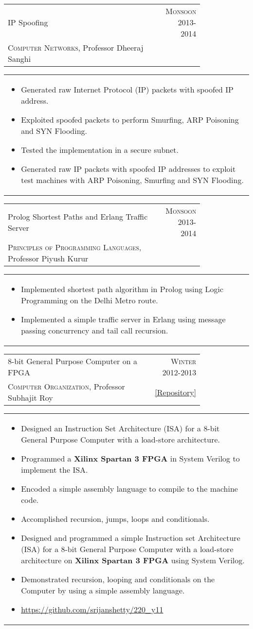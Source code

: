 \documentclass[a4paper,10pt]{article} %
\newcommand{\cproject}[5]{
    \begin{tabular}{p{0.80\linewidth}r}
        \textcolor{NavyBlue}{#2} & \multicolumn{1}{m{4cm}}{\raggedleft \textsc{#1}}\\
        #3 & #4
    \end{tabular}
    \begin{tabular}{p{\linewidth}}
    \vspace{-0.3cm}
        \footnotesize{#5}
    \end{tabular}
    \vspace{-0.5cm}
}
\newcommand{\lproject}[4]{
    \begin{tabular}{p{0.80\linewidth}r}
        \textcolor{NavyBlue}{#2} & \multicolumn{1}{m{4cm}}{\raggedleft \textsc{#1}}\\
        #3
    \end{tabular}
    \begin{tabular}{p{\linewidth}}
    \vspace{-0.3cm}
        \footnotesize{#4}
    \end{tabular}
    \vspace{-0.5cm}
}
\begin{document}
\lproject {Monsoon 2013-2014}
          {IP Spoofing}
          {\textsc{Computer Networks}, Professor Dheeraj Sanghi}
          {
              \begin{itemize}[leftmargin=0.5cm]
                  \item Generated raw Internet Protocol (IP) packets with spoofed IP address.
                  \item Exploited spoofed packets to perform Smurfing, ARP Poisoning and SYN Flooding.
                  \item Tested the implementation in a secure subnet.
                  \item Generated raw IP packets with spoofed IP addresses to exploit test machines with ARP Poisoning,
                      Smurfing and SYN Flooding.
              \end{itemize}
          }

\lproject {Monsoon 2013-2014}
          {Prolog Shortest Paths and Erlang Traffic Server}
          {\textsc{Principles of Programming Languages}, Professor Piyush Kurur}
          {
               \begin{itemize}[leftmargin=0.5cm]
                   \item Implemented shortest path algorithm in Prolog using Logic Programming on the Delhi Metro route.
                   \item Implemented a simple traffic server in Erlang using message passing concurrency and tail call recursion.
               \end{itemize}
           }

\cproject
    {Winter 2012-2013}
    {8-bit General Purpose Computer on a FPGA}
    {\textsc{Computer Organization}, Professor Subhajit Roy}
    { \href{https://github.com/srijanshetty/220\_y11} {\footnotesize{[Repository]}} }
          {
              \begin{itemize}[leftmargin=0.5cm]
                  \item Designed an Instruction Set Architecture (ISA) for a 8-bit General Purpose Computer with a load-store architecture.
                  \item Programmed a \textbf{Xilinx Spartan 3 FPGA} in System Verilog to implement the ISA.
                  \item Encoded a simple assembly language to compile to the machine code.
                  \item Accomplished recursion, jumps, loops and conditionals.
                  \item Designed and programmed a simple Instruction set Architecture (ISA) for a 8-bit General Purpose Computer with a load-store
                      architecture on \textbf{Xilinx Spartan 3 FPGA} using System Verilog.
                  \item Demonstrated recursion, looping and conditionals on the Computer by using a simple assembly language.
                  \item \href{https://github.com/srijanshetty/220\_y11} {https://github.com/srijanshetty/220\_y11}
              \end{itemize}
          }
\end{document}
